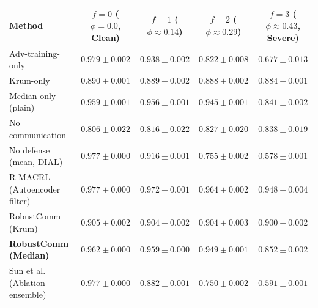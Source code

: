 \begin{tabular}{@{}lcccc@{}}
\toprule
Method & $f=0$ ($\phi=0.0$, Clean) & $f=1$ ($\phi \approx 0.14$) & $f=2$ ($\phi \approx 0.29$) & $f=3$ ($\phi \approx 0.43$, Severe) \\
\midrule
Adv-training-only & $0.979 \pm 0.002$ & $0.938 \pm 0.002$ & $0.822 \pm 0.008$ & $0.677 \pm 0.013$ \\
Krum-only & $0.890 \pm 0.001$ & $0.889 \pm 0.002$ & $0.888 \pm 0.002$ & $0.884 \pm 0.001$ \\
Median-only (plain) & $0.959 \pm 0.001$ & $0.956 \pm 0.001$ & $0.945 \pm 0.001$ & $0.841 \pm 0.002$ \\
No communication & $0.806 \pm 0.022$ & $0.816 \pm 0.022$ & $0.827 \pm 0.020$ & $0.838 \pm 0.019$ \\
No defense (mean, DIAL) & $0.977 \pm 0.000$ & $0.916 \pm 0.001$ & $0.755 \pm 0.002$ & $0.578 \pm 0.001$ \\
R-MACRL (Autoencoder filter) & $0.977 \pm 0.000$ & $0.972 \pm 0.001$ & $0.964 \pm 0.002$ & $0.948 \pm 0.004$ \\
RobustComm (Krum) & $0.905 \pm 0.002$ & $0.904 \pm 0.002$ & $0.904 \pm 0.003$ & $0.900 \pm 0.002$ \\
\textbf{RobustComm (Median)} & $0.962 \pm 0.000$ & $0.959 \pm 0.000$ & $0.949 \pm 0.001$ & $0.852 \pm 0.002$ \\
Sun et al. (Ablation ensemble) & $0.977 \pm 0.000$ & $0.882 \pm 0.001$ & $0.750 \pm 0.002$ & $0.591 \pm 0.001$ \\
\bottomrule
\end{tabular}
